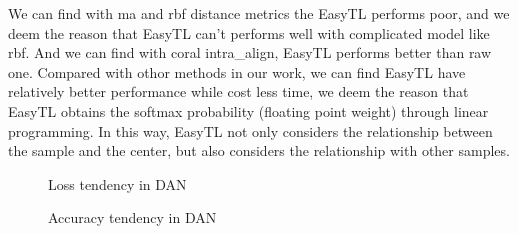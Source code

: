 \documentclass[conference]{IEEEtran}
\begin{document}
We can find with ma and rbf distance metrics the EasyTL performs poor, and we deem the reason that EasyTL can't performs well with complicated model like rbf. And we can find with coral intra\_align, EasyTL performs better than raw one. Compared with othor methods in our work, we can find EasyTL have relatively better performance while cost less time, we deem the reason that EasyTL obtains the softmax probability (floating point weight) through linear programming. In this way, EasyTL not only considers the relationship between the sample and the center, but also considers the relationship with other samples.

\begin{center}
	\begin{figure}
		\centering
		\quad
		\quad
		\caption{Loss tendency in DAN}
		\label{kFig4}
	\end{figure}
\end{center}

\begin{center}
	\begin{figure}
		\centering
		\caption{Accuracy tendency in DAN}
		\label{kFig5}
	\end{figure}
\end{center}
\end{document}
